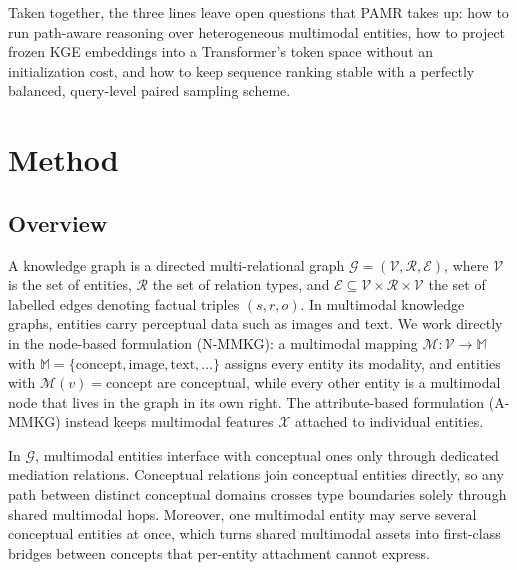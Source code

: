 \documentclass[runningheads]{llncs}
\begin{document}

Taken together, the three lines leave open questions that PAMR takes up: how to run path-aware reasoning over heterogeneous multimodal entities, how to project frozen KGE embeddings into a Transformer's token space without an initialization cost, and how to keep sequence ranking stable with a perfectly balanced, query-level paired sampling scheme.

\section{Method}
\label{sec:method}
\subsection{Overview}
\label{sec:overview}

A knowledge graph is a directed multi-relational graph
$\mathcal{G} = (\mathcal{V}, \mathcal{R}, \mathcal{E})$, where $\mathcal{V}$
is the set of entities, $\mathcal{R}$ the set of relation types, and
$\mathcal{E} \subseteq \mathcal{V} \times \mathcal{R} \times \mathcal{V}$ the
set of labelled edges denoting factual triples $(s, r, o)$. In multimodal
knowledge graphs, entities carry perceptual data such as images and text.
We work directly in the node-based formulation (N-MMKG): a multimodal
mapping $\mathcal{M}: \mathcal{V} \rightarrow \mathbb{M}$ with
$\mathbb{M} = \{\text{concept}, \text{image}, \text{text}, \ldots\}$
assigns every entity its modality, and entities with
$\mathcal{M}(v) = \text{concept}$ are conceptual, while every other
entity is a multimodal node that lives in the graph in its own right.
The attribute-based formulation (A-MMKG) instead keeps multimodal
features $\mathcal{X}$ attached to individual entities.

In $\mathcal{G}$, multimodal entities interface with conceptual ones
only through dedicated mediation relations. Conceptual relations join
conceptual entities directly, so any path between distinct conceptual
domains crosses type boundaries solely through shared multimodal hops.
Moreover, one multimodal entity may serve several conceptual entities
at once, which turns shared multimodal assets into first-class bridges
between concepts that per-entity attachment cannot express.
\end{document}
